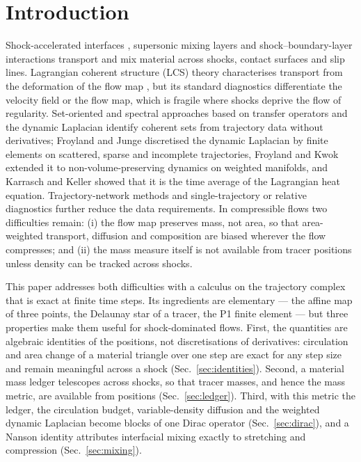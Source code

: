\documentclass[11pt]{article}
\theoremstyle{definition}\newtheorem{definition}{Definition}\theoremstyle{remark}\newtheorem{remark}{Remark}
\begin{document}
\section{Introduction}
Shock-accelerated interfaces \citep{HaasSturtevant1987,PiconeBoris1988,SamtaneyZabusky1994}, supersonic mixing layers and shock--boundary-layer interactions transport and mix material across shocks, contact surfaces and slip lines. Lagrangian coherent structure (LCS) theory characterises transport from the deformation of the flow map \citep{Haller2015,Hadjighasem2017}, but its standard diagnostics differentiate the velocity field or the flow map, which is fragile where shocks deprive the flow of regularity. Set-oriented and spectral approaches based on transfer operators and the dynamic Laplacian \citep{Froyland2015} identify coherent sets from trajectory data without derivatives; Froyland and Junge \citep{FroylandJunge2018} discretised the dynamic Laplacian by finite elements on scattered, sparse and incomplete trajectories, Froyland and Kwok \citep{FroylandKwok2020} extended it to non-volume-preserving dynamics on weighted manifolds, and Karrasch and Keller \citep{KarraschKeller2020} showed that it is the time average of the Lagrangian heat equation. Trajectory-network methods \citep{Iacobello2021,PadbergGehle2017,BanischKoltai2017} and single-trajectory or relative diagnostics \citep{Haller2021,Aksamit2024} further reduce the data requirements. In compressible flows two difficulties remain: (i) the flow map preserves mass, not area, so that area-weighted transport, diffusion and composition are biased wherever the flow compresses; and (ii) the mass measure itself is not available from tracer positions unless density can be tracked across shocks.

This paper addresses both difficulties with a calculus on the trajectory complex that is exact at finite time steps. Its ingredients are elementary --- the affine map of three points, the Delaunay star of a tracer, the P1 finite element --- but three properties make them useful for shock-dominated flows. First, the quantities are algebraic identities of the positions, not discretisations of derivatives: circulation and area change of a material triangle over one step are exact for any step size and remain meaningful across a shock (Sec.~\ref{sec:identities}). Second, a material mass ledger telescopes across shocks, so that tracer masses, and hence the mass metric, are available from positions (Sec.~\ref{sec:ledger}). Third, with this metric the ledger, the circulation budget, variable-density diffusion and the weighted dynamic Laplacian become blocks of one Dirac operator (Sec.~\ref{sec:dirac}), and a Nanson identity attributes interfacial mixing exactly to stretching and compression (Sec.~\ref{sec:mixing}).
\end{document}
